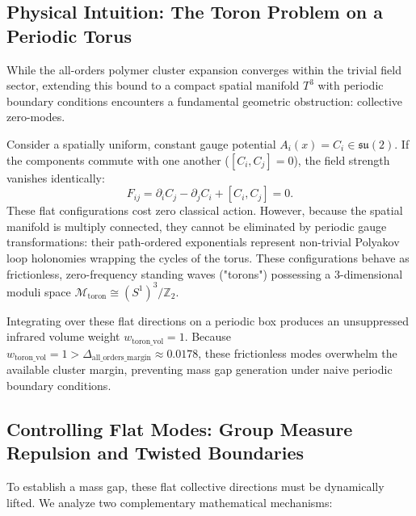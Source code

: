 \documentclass[11pt,a4paper]{article}
\theoremstyle{definition}
\theoremstyle{remark}
\begin{document}
\subsection{Physical Intuition: The Toron Problem on a Periodic Torus}
While the all-orders polymer cluster expansion converges within the trivial field sector, extending this bound to a compact spatial manifold $T^3$ with periodic boundary conditions encounters a fundamental geometric obstruction: collective zero-modes.

Consider a spatially uniform, constant gauge potential $A_i(x) = C_i \in \mathfrak{su}(2)$. If the components commute with one another ($[C_i, C_j] = 0$), the field strength vanishes identically:
\begin{equation}
F_{ij} = \partial_i C_j - \partial_j C_i + [C_i, C_j] = 0.
\end{equation}
These flat configurations cost zero classical action. However, because the spatial manifold is multiply connected, they cannot be eliminated by periodic gauge transformations: their path-ordered exponentials represent non-trivial Polyakov loop holonomies wrapping the cycles of the torus. These configurations behave as frictionless, zero-frequency standing waves ("torons") possessing a 3-dimensional moduli space $\mathcal{M}_{\mathrm{toron}} \cong (S^1)^3 / \mathbb{Z}_2$.

Integrating over these flat directions on a periodic box produces an unsuppressed infrared volume weight $w_{\mathrm{toron\_vol}} = 1$. Because $w_{\mathrm{toron\_vol}} = 1 > \Delta_{\mathrm{all\_orders\_margin}} \approx 0.0178$, these frictionless modes overwhelm the available cluster margin, preventing mass gap generation under naive periodic boundary conditions.

\subsection{Controlling Flat Modes: Group Measure Repulsion and Twisted Boundaries}
To establish a mass gap, these flat collective directions must be dynamically lifted. We analyze two complementary mathematical mechanisms:
\end{document}
